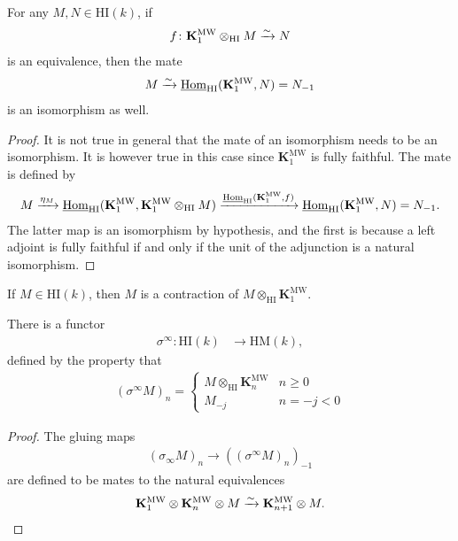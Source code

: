 \documentclass[11pt,openany]{book}
\providecommand{\HI}{\mathrm{HI}}
\providecommand{\HM}{\mathrm{HM}}
\providecommand{\KMW}{\mathbf{K}^\mathrm{MW}}
\begin{document}
\begin{corollary} For any $M,N \in \HI(k)$, if
\begin{align*}
    f\colon \KMW_1 \otimes_\HI M \xto{\sim} N
\end{align*}
is an equivalence, then the mate
\begin{align*}
    M \xto{\sim} \underline{\Hom}_\HI(\KMW_1,N) = N_{-1}
\end{align*}
is an isomorphism as well.
\end{corollary}
\begin{proof} It is not true in general that the mate of an isomorphism needs to be an isomorphism. It is however true in this case since $\KMW_1$ is fully faithful. The mate is defined by
\begin{align*}
    M \xto{\eta_M} \underline{\Hom}_\HI(\KMW_1, \KMW_1 \otimes_\HI M) \xto{\underline{\Hom}_\HI(\KMW_1,f)} \underline{\Hom}_\HI(\KMW_1,N) = N_{-1}.
\end{align*}
The latter map is an isomorphism by hypothesis, and the first is because a left adjoint is fully faithful if and only if the unit of the adjunction is a natural isomorphism.
\end{proof}



\begin{corollary} If $M \in \HI(k)$, then $M$ is a contraction of $M \otimes_\HI \KMW_1$.
\end{corollary}

\begin{proposition} There is a functor
\begin{align*}
    \sigma^\infty \colon \HI(k) &\to \HM(k),
\end{align*}
defined by the property that 
\begin{align*}
    (\sigma^\infty M)_n = \begin{cases} 
    M \otimes_\HI \KMW_n & n\ge 0 \\
    M_{-j} & n=-j < 0 \end{cases}
\end{align*}
\end{proposition}
\begin{proof} The gluing maps
\begin{align*}
    (\sigma_\infty M)_n \to \left( (\sigma^\infty M)_n \right)_{-1}
\end{align*}
are defined to be mates to the natural equivalences
\begin{align*}
    \KMW_1 \otimes \KMW_n \otimes M \xto{\sim} \KMW_{n+1} \otimes M.
\end{align*}
\end{proof}
\end{document}
